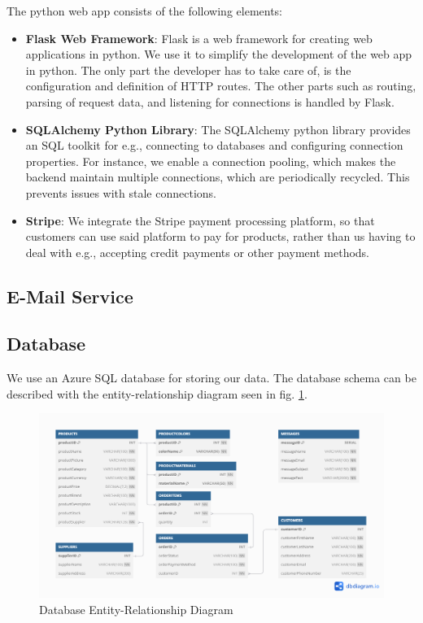 The python web app consists of the following elements:

\begin{itemize}
    \item \textbf{Flask Web Framework}: Flask is a web framework for creating web applications in python.
    We use it to simplify the development of the web app in python.
    The only part the developer has to take care of, is the configuration and definition of HTTP routes.
    The other parts such as routing, parsing of request data, and listening for connections is handled by Flask.
    \item \textbf{SQLAlchemy Python Library}: The SQLAlchemy python library provides an SQL toolkit for e.g., 
    connecting to databases and configuring connection properties.
    For instance, we enable a connection pooling, which makes the backend maintain multiple connections,
    which are periodically recycled. This prevents issues with stale connections.
    \item \textbf{Stripe}: We integrate the Stripe payment processing platform, so that customers can use said platform
    to pay for products, rather than us having to deal with e.g., 
    accepting credit payments or other payment methods.
\end{itemize}

\subsection{E-Mail Service}

\subsection{Database}
We use an Azure SQL database for storing our data.
The database schema can be described with the
entity-relationship diagram seen in fig. \ref{fig:db_er_diagram}.
\begin{figure}[!h!]
    \centering
    \includegraphics[width=\textwidth]{images/db_er_diagram.png}
    \caption{Database Entity-Relationship Diagram}
    \label{fig:db_er_diagram}
\end{figure}

